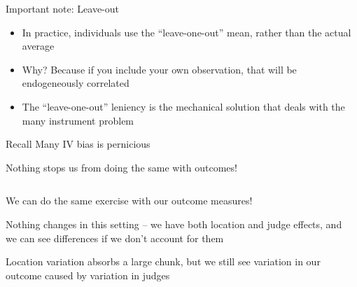 \documentclass[notes,11pt, aspectratio=169]{beamer}
\newenvironment{wideitemize}{\itemize\addtolength{\itemsep}{10pt}}{\enditemize}
\begin{document}
  \begin{frame}{ Important note: Leave-out}
    \begin{itemize}
    \item In practice, individuals use the ``leave-one-out'' mean,
      rather than the actual average
    \item Why? Because if you include your own observation, that will
      be endogeneously correlated
    \item The ``leave-one-out'' leniency is the mechanical solution
      that deals with the many instrument problem
    \end{itemize}
  \end{frame}

  \begin{frame}{ Recall Many IV bias is pernicious}
  \end{frame}
  

\begin{frame}{Nothing stops us from doing the same with outcomes!}
    \begin{columns}[onlytextwidth, T] %
      \begin{column}{.5\textwidth}
        \begin{wideitemize}
        \item We can do the same exercise with our outcome measures!
        \item Nothing changes in this setting -- we have both location
          and judge effects, and we can see differences if we don't
          account for them
        \item Location variation absorbs a large chunk, but we still
          see variation in our outcome caused by variation in judges
        \end{wideitemize}
      \end{column}%
      \hfill%
      \begin{column}{.5\textwidth}
      \end{column}%
    \end{columns}
\end{frame}
\end{document}
